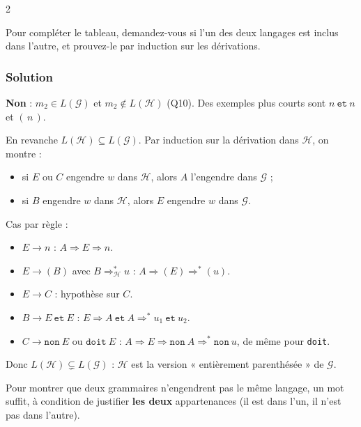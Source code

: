 \documentclass[11pt,a4paper]{article}
\providecommand{\tightlist}{\setlength{\itemsep}{0pt}\setlength{\parskip}{0pt}}
\begin{document}
\begin{indication}{2}

Pour compléter le tableau, demandez-vous si l'un des deux langages est inclus dans l'autre, et prouvez-le par induction sur les dérivations.

\end{indication}

\hypertarget{solution-10}{%
\subsubsection{Solution}\label{solution-10}}

\textbf{Non} : \(m_2\in L(\mathcal G)\) et \(m_2\notin L(\mathcal H)\) (Q10). Des exemples plus courts sont \(n\ \mathtt{et}\ n\) et \((\,n\,)\).

En revanche \(L(\mathcal H)\subseteq L(\mathcal G)\). Par induction sur la dérivation dans \(\mathcal H\), on montre :

\begin{itemize}
\tightlist
\item
  si \(E\) ou \(C\) engendre \(w\) dans \(\mathcal H\), alors \(A\) l'engendre dans \(\mathcal G\) ;
\item
  si \(B\) engendre \(w\) dans \(\mathcal H\), alors \(E\) engendre \(w\) dans \(\mathcal G\).
\end{itemize}

Cas par règle :

\begin{itemize}
\tightlist
\item
  \(E\to n\) : \(A\Rightarrow E\Rightarrow n\).
\item
  \(E\to(B)\) avec \(B\Rightarrow^*_{\mathcal H}u\) : \(A\Rightarrow(E)\Rightarrow^*(u)\).
\item
  \(E\to C\) : hypothèse sur \(C\).
\item
  \(B\to E\ \mathtt{et}\ E\) : \(E\Rightarrow A\ \mathtt{et}\ A\Rightarrow^*u_1\ \mathtt{et}\ u_2\).
\item
  \(C\to\mathtt{non}\ E\) ou \(\mathtt{doit}\ E\) : \(A\Rightarrow E\Rightarrow\mathtt{non}\ A\Rightarrow^*\mathtt{non}\ u\), de même pour \texttt{doit}.
\end{itemize}

Donc \(L(\mathcal H)\subsetneq L(\mathcal G)\) : \(\mathcal H\) est la version « entièrement parenthésée » de \(\mathcal G\).

\begin{methode}

Pour montrer que deux grammaires n'engendrent pas le même langage, un mot suffit, à condition de justifier \textbf{les deux} appartenances (il est dans l'un, il n'est pas dans l'autre).

\end{methode}
\end{document}
